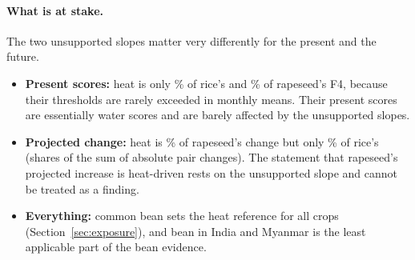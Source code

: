 \paragraph{What is at stake.} The two unsupported slopes matter very differently for the present and the future.
\begin{itemize}
\item \textbf{Present scores:} heat is only \parHeatPresRice\% of rice's and \parHeatPresRape\% of rapeseed's F4,
because their thresholds are rarely exceeded in monthly means. Their present scores are essentially water scores and
are barely affected by the unsupported slopes.
\item \textbf{Projected change:} heat is \parHeatFutRape\% of rapeseed's change but only \parHeatFutRice\% of rice's
(shares of the sum of absolute pair changes). The statement that rapeseed's projected increase is heat-driven rests
on the unsupported slope and cannot be treated as a finding.
\item \textbf{Everything:} common bean sets the heat reference for all crops (Section~\ref{sec:exposure}), and bean in
India and Myanmar is the least applicable part of the bean evidence.
\end{itemize}

